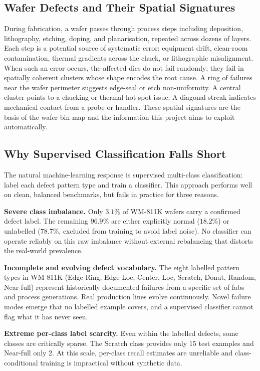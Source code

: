 \documentclass[11pt]{article}
\begin{document}
\subsection{Wafer Defects and Their Spatial Signatures}

During fabrication, a wafer passes through process steps including deposition,
lithography, etching, doping, and planarisation, repeated across dozens of
layers. Each step is a potential source of systematic error: equipment drift,
clean-room contamination, thermal gradients across the chuck, or lithographic
misalignment. When such an error occurs, the affected dies do not fail randomly;
they fail in spatially coherent clusters whose shape encodes the root cause.
A ring of failures near the wafer perimeter suggests edge-seal or etch
non-uniformity. A central cluster points to a chucking or thermal hot-spot
issue. A diagonal streak indicates mechanical contact from a probe or handler.
These spatial signatures are the basis of the wafer bin map and the information
this project aims to exploit automatically.

\subsection{Why Supervised Classification Falls Short}

The natural machine-learning response is supervised multi-class classification:
label each defect pattern type and train a classifier. This approach performs
well on clean, balanced benchmarks, but fails in practice for three reasons.

\textbf{Severe class imbalance.} Only $3.1\%$ of WM-811K wafers carry a
confirmed defect label. The remaining $96.9\%$ are either explicitly normal
($18.2\%$) or unlabelled ($78.7\%$, excluded from training to avoid label
noise). No classifier can operate reliably on this raw imbalance without
external rebalancing that distorts the real-world prevalence.

\textbf{Incomplete and evolving defect vocabulary.} The eight labelled pattern
types in WM-811K (Edge-Ring, Edge-Loc, Center, Loc, Scratch, Donut, Random,
Near-full) represent historically documented failures from a specific set of
fabs and process generations. Real production lines evolve continuously.
Novel failure modes emerge that no labelled example covers, and a supervised
classifier cannot flag what it has never seen.

\textbf{Extreme per-class label scarcity.} Even within the labelled defects,
some classes are critically sparse. The Scratch class provides only 15 test
examples and Near-full only 2. At this scale, per-class recall estimates are
unreliable and class-conditional training is impractical without synthetic data.
\end{document}
